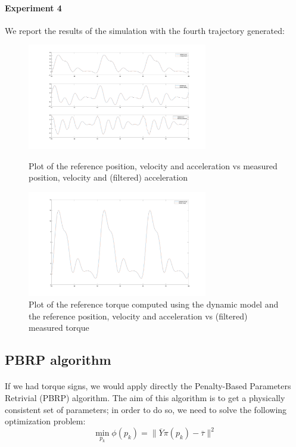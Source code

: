 \documentclass{article}
\begin{document}
\paragraph{Experiment 4}
We report the results of the simulation with the fourth trajectory generated:
\begin{figure}[!htbp]
\centering
\includegraphics[width=0.7\textwidth]{images/1-dof/experiment4_traj.png}
\caption{Plot of the reference position, velocity and acceleration vs measured position, velocity and (filtered) acceleration}
\includegraphics[width=0.7\textwidth]{images/1-dof/experiment4.png}
\caption{Plot of the reference torque computed using the dynamic model and the reference position, velocity and acceleration vs (filtered) measured torque}
\end{figure}
\pagebreak

\subsection{PBRP algorithm}
\paragraph{}If we had torque signs, we would apply directly the Penalty-Based Parameters Retrivial (PBRP) algorithm. The aim of this algorithm is to get a physically consistent set of parameters; in order to do so, we need to solve the following optimization problem:
\[\min_{p_k}{\phi(p_k)} = \lVert \overline{Y}\pi(p_k)-\overline{\tau} \rVert^2\]
\end{document}
